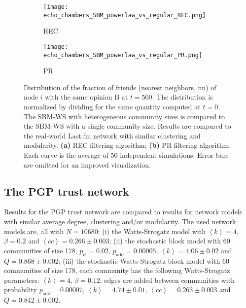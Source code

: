 \documentclass[11 pt , letterpaper , twoside , openright]{book}
\begin{document}
\begin{figure}[H]
  \begin{subfigure}[b]{0.49\textwidth}
    \caption{REC}
  	\texttt{[image: echo\_chambers\_SBM\_powerlaw\_vs\_regular\_REC.png]}
    \label{pr_pow_single}
  \end{subfigure}
  \begin{subfigure}[b]{0.49\textwidth}
    \caption{PR}
  	\texttt{[image: echo\_chambers\_SBM\_powerlaw\_vs\_regular\_PR.png]}
    \label{rec_pow_single}
  \end{subfigure}
  \captionsetup{format=plain}
  \caption[Distribution of the fraction of friends (nearest neighbors, nn) of node $i$ with the same opinion B at $t = 500$. The SBM-WS with heterogeneous community sizes is compared to the SBM-WS with a single community size. Results are compared to the real-world Last.fm network with similar clustering and modularity. Results for the REC and PR filtering algorithms.]{Distribution of the fraction of friends (nearest neighbors, nn) of node $i$ with the same opinion B at $t = 500$. The distribution is normalized by dividing for the same quantity computed at $t=0$. The SBM-WS with heterogeneous community sizes is compared to the SBM-WS with a single community size. Results are compared to the real-world Last.fm network with similar clustering and modularity. \textbf{(a)} REC filtering algorithm; \textbf{(b)} PR filtering algorithm. Each curve is the average of $50$ independent simulations. Error bars are omitted for an improved visualization.}
\label{power_vs_single}
\end{figure}

\subsection{The PGP trust network}

Results for the PGP trust network are compared to results for network models with similar average degree, clustering and/or modularity. The used network models are, all with $N = 10680$: (i) the Watts-Strogatz model with $\left<k\right> = 4$, $\beta = 0.2$ and $\left<cc\right> = 0.266 \pm 0.003$; (ii) the stochastic block model with 60 communities of size 178, $p_\text{cl} = 0.02$, $p_\text{add} = 0.00005$, $\left<k\right> = 4.06 \pm 0.02$ and $Q = 0.868 \pm 0.002$; (iii) the stochastic Watts-Strogatz block model with 60 communities of size 178, each community has the following Watts-Strogatz parameters: $\left<k\right> = 4$, $\beta = 0.12$; edges are added between communities with probability $p_\text{add} = 0.00007$, $\left<k\right> = 4.74 \pm 0.01$, $\left<cc\right> = 0.263 \pm 0.003$ and $Q = 0.842 \pm 0.002$.
\end{document}

